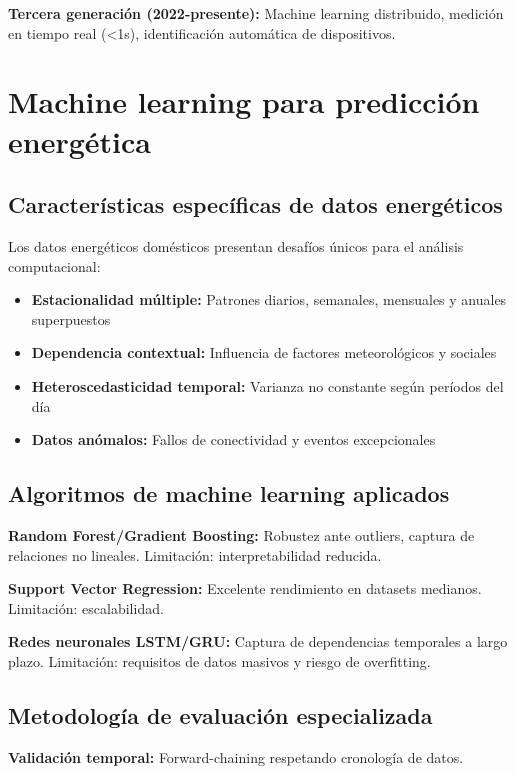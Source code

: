 \textbf{Tercera generación (2022-presente):} Machine learning distribuido, medición en tiempo real (<1s), identificación automática de dispositivos.

\section{Machine learning para predicción energética}

\subsection{Características específicas de datos energéticos}

Los datos energéticos domésticos presentan desafíos únicos para el análisis computacional:

\begin{itemize}
    \item \textbf{Estacionalidad múltiple:} Patrones diarios, semanales, mensuales y anuales superpuestos
    \item \textbf{Dependencia contextual:} Influencia de factores meteorológicos y sociales
    \item \textbf{Heteroscedasticidad temporal:} Varianza no constante según períodos del día
    \item \textbf{Datos anómalos:} Fallos de conectividad y eventos excepcionales
\end{itemize}

\subsection{Algoritmos de machine learning aplicados}

\textbf{Random Forest/Gradient Boosting:} Robustez ante outliers, captura de relaciones no lineales. Limitación: interpretabilidad reducida.

\textbf{Support Vector Regression:} Excelente rendimiento en datasets medianos. Limitación: escalabilidad.

\textbf{Redes neuronales LSTM/GRU:} Captura de dependencias temporales a largo plazo. Limitación: requisitos de datos masivos y riesgo de overfitting.

\subsection{Metodología de evaluación especializada}

\textbf{Validación temporal:} Forward-chaining respetando cronología de datos.

